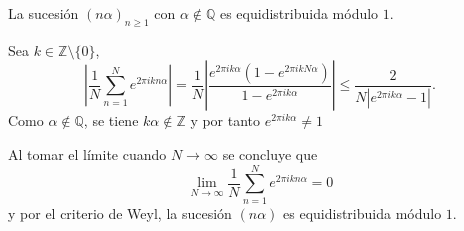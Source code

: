 \begin{example}
    La sucesión $(n\alpha)_{n\geq1}$ con $\alpha \notin \mathbb{Q}$ es equidistribuida módulo $1$.
\end{example}

\begin{resolve}
    Sea $k \in \mathbb{Z}\setminus\{0\}$,
    \[
        \left|\frac{1}{N}\sum_{n=1}^N e^{2\pi i k n\alpha} \right| =
        \frac{1}{N} \left|\frac{e^{2\pi i k \alpha}(1-e^{2\pi i k N \alpha})}{1-e^{2\pi i k \alpha}} \right| \leq
        \frac{2}{N|e^{2\pi i k \alpha}-1|}.
    \]
    Como $\alpha \notin \mathbb{Q}$, se tiene $k\alpha \notin \mathbb{Z}$ y por tanto $e^{2\pi i k \alpha} \neq 1$
    
    Al tomar el límite cuando $N \to \infty$ se concluye que
    \[
        \lim_{N \to \infty} \frac{1}{N}\sum_{n=1}^N e^{2\pi i k n\alpha} = 0
    \]
    y por el criterio de Weyl, la sucesión $(n\alpha)$ es equidistribuida módulo $1$.
\end{resolve}

